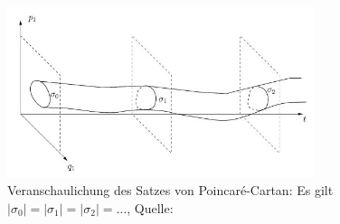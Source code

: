 \documentclass[11pt,a4paper]{article}
\begin{document}
\begin{figure}[h]
\centering
\includegraphics[width=9cm]{PoinCart}
\caption{Veranschaulichung des Satzes von Poincar\'{e}-Cartan: Es gilt $ \vert \sigma_0 \vert = \vert \sigma_1 \vert = \vert \sigma_2 \vert = \ldots $, Quelle: \cite{Wim}}
\label{PoinMap}
\end{figure}
\end{document}
